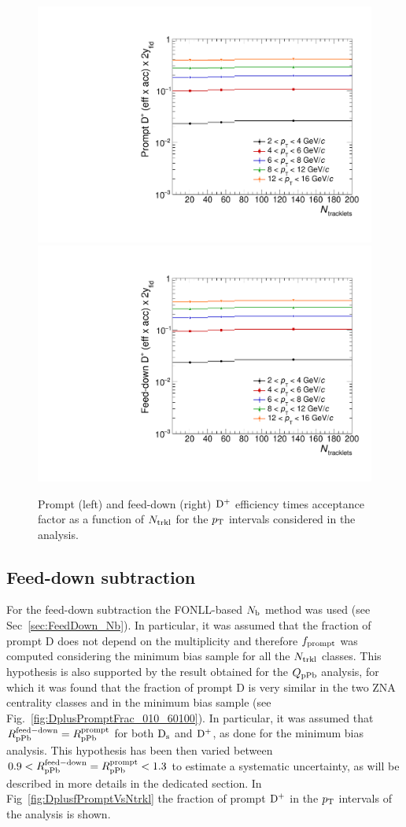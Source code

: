\begin{figure}[htpb]
\centering
 \includegraphics[width=.45\textwidth]{FigCap6/Efficiency_times_Acceptance_VsNtrkl_Central_d0Cut_ImpTask_Prompt.pdf}
 \includegraphics[width=.45\textwidth]{FigCap6/Efficiency_times_Acceptance_VsNtrkl_Central_d0Cut_ImpTask_FD.pdf}
  \caption{Prompt (left) and feed-down (right) ${\rm D^+}$ efficiency times acceptance factor as a function of $N_{\rm trkl}$ for the $p_{\rm T}$ intervals considered in the analysis.}
 \label{fig:DplusEffAccVsNtrkl}
\end{figure}


\subsection {Feed-down subtraction}
For the feed-down subtraction the FONLL-based $N_{\rm b}$ method was used (see Sec~\ref{sec:FeedDown_Nb}). In particular, it was assumed that the fraction of prompt D does not depend on the multiplicity and therefore $f_{\rm prompt}$ was computed considering the minimum bias sample for all the $N_{\rm trkl}$ classes. This hypothesis is also supported by the result obtained for the $Q_{\rm pPb}$ analysis, for which it was found that the fraction of prompt D is very similar in the two ZNA centrality classes and in the minimum bias sample (see Fig.~\ref{fig:DplusPromptFrac_010_60100}). In particular, it was assumed that $R_{\rm pPb}^{\rm feed-down} = R_{\rm pPb}^{\rm prompt}$ for both ${\rm D_s}$ and ${\rm D^+}$, as done for the minimum bias analysis. This hypothesis has been then varied between $0.9 < R_{\rm pPb}^{\rm feed-down} = R_{\rm pPb}^{\rm prompt} <1.3$ to estimate a systematic uncertainty, as will be described in more details in the dedicated section. In Fig~\ref{fig:DplusfPromptVsNtrkl} the fraction of prompt ${\rm D^+}$ in the $p_{\rm T}$ intervals of the analysis is shown.

